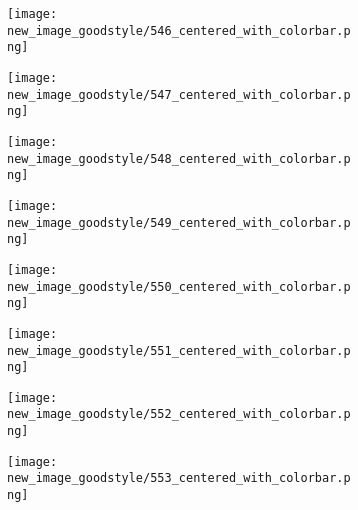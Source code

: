 \documentclass[a4paper,12pt]{article}
\begin{document}
\begin{figure}[H]
  \begin{subfigure}{0.11\textwidth}
    \texttt{[image: new\_image\_goodstyle/546\_centered\_with\_colorbar.png]}
  \end{subfigure}
  \hfill
  \begin{subfigure}{0.11\textwidth}
    \texttt{[image: new\_image\_goodstyle/547\_centered\_with\_colorbar.png]}
  \end{subfigure}
  \hfill
  \begin{subfigure}{0.11\textwidth}
    \texttt{[image: new\_image\_goodstyle/548\_centered\_with\_colorbar.png]}
  \end{subfigure}
  \hfill
  \begin{subfigure}{0.11\textwidth}
    \texttt{[image: new\_image\_goodstyle/549\_centered\_with\_colorbar.png]}
  \end{subfigure}
  \hfill
  \begin{subfigure}{0.11\textwidth}
    \texttt{[image: new\_image\_goodstyle/550\_centered\_with\_colorbar.png]}
  \end{subfigure}
  \hfill
  \begin{subfigure}{0.11\textwidth}
    \texttt{[image: new\_image\_goodstyle/551\_centered\_with\_colorbar.png]}
  \end{subfigure}
  \hfill
  \begin{subfigure}{0.11\textwidth}
    \texttt{[image: new\_image\_goodstyle/552\_centered\_with\_colorbar.png]}
  \end{subfigure}
  \hfill
  \begin{subfigure}{0.11\textwidth}
    \texttt{[image: new\_image\_goodstyle/553\_centered\_with\_colorbar.png]}
  \end{subfigure}
  \hfill
\end{figure}
\end{document}

